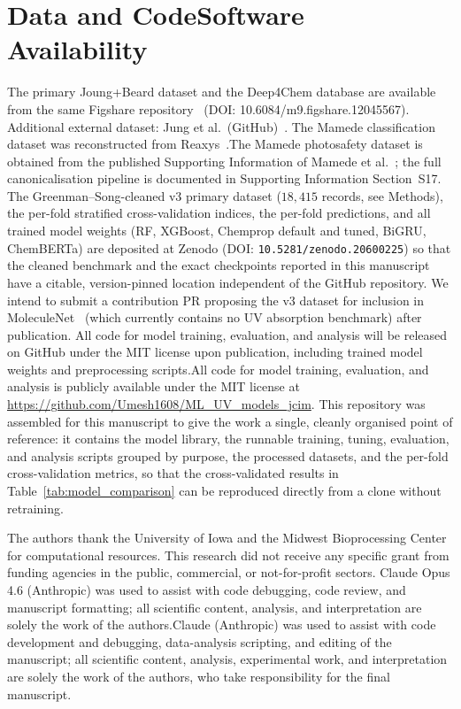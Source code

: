 \documentclass[journal=jcisd8,manuscript=article]{achemso}
\newcommand{\added}[1]{{\color{addedblue}#1}}
\newcommand{\removed}[1]{{\color{removedred}#1}}
\newcommand{\addedii}[1]{{\color{addedgreen}#1}}
\newcommand{\removedii}[1]{{\color{removedorange}#1}}
\begin{document}
\section*{Data and \removed{Code}\added{Software} Availability}
The primary Joung+Beard dataset and the Deep4Chem database are available from the same Figshare repository~\cite{joung2020experimental, beard2019comparative} (DOI: 10.6084/m9.figshare.12045567).
Additional external dataset: Jung et al.\ (GitHub)~\cite{jung2024machine}.
\removed{The Mamede classification dataset was reconstructed from Reaxys~\cite{mamede2021machine}.}\added{The Mamede photosafety dataset is obtained from the published Supporting Information of Mamede et al.~\cite{mamede2021machine}; the full canonicalisation pipeline is documented in Supporting Information Section~S17.}
\added{The Greenman--Song-cleaned v3 primary dataset ($18{,}415$ records, see Methods), the per-fold stratified cross-validation indices, the per-fold predictions, and all trained model weights (RF, XGBoost, Chemprop default and tuned, BiGRU, ChemBERTa) are deposited at Zenodo (DOI: \texttt{10.5281/zenodo.20600225}) so that the cleaned benchmark and the exact checkpoints reported in this manuscript have a citable, version-pinned location independent of the GitHub repository. We intend to submit a contribution PR proposing the v3 dataset for inclusion in MoleculeNet~\cite{wuMoleculeNet2018} (which currently contains no UV absorption benchmark) after publication.}
\removed{All code for model training, evaluation, and analysis will be released on GitHub under the MIT license upon publication, including trained model weights and preprocessing scripts.}\added{All code for model training, evaluation, and analysis is publicly available under the MIT license at \url{https://github.com/Umesh1608/ML_UV_models_jcim}. This repository was assembled for this manuscript to give the work a single, cleanly organised point of reference: it contains the model library, the runnable training, tuning, evaluation, and analysis scripts grouped by purpose, the processed datasets, and the per-fold cross-validation metrics, so that the cross-validated results in Table~\ref{tab:model_comparison} can be reproduced directly from a clone without retraining.}


\begin{acknowledgement}
The authors thank the University of Iowa and the Midwest Bioprocessing Center for computational resources.
This research did not receive any specific grant from funding agencies in the public, commercial, or not-for-profit sectors.
\removedii{Claude Opus 4.6 (Anthropic) was used to assist with code debugging, code review, and manuscript formatting; all scientific content, analysis, and interpretation are solely the work of the authors.}\addedii{Claude (Anthropic) was used to assist with code development and debugging, data-analysis scripting, and editing of the manuscript; all scientific content, analysis, experimental work, and interpretation are solely the work of the authors, who take responsibility for the final manuscript.}
\end{acknowledgement}
\end{document}
